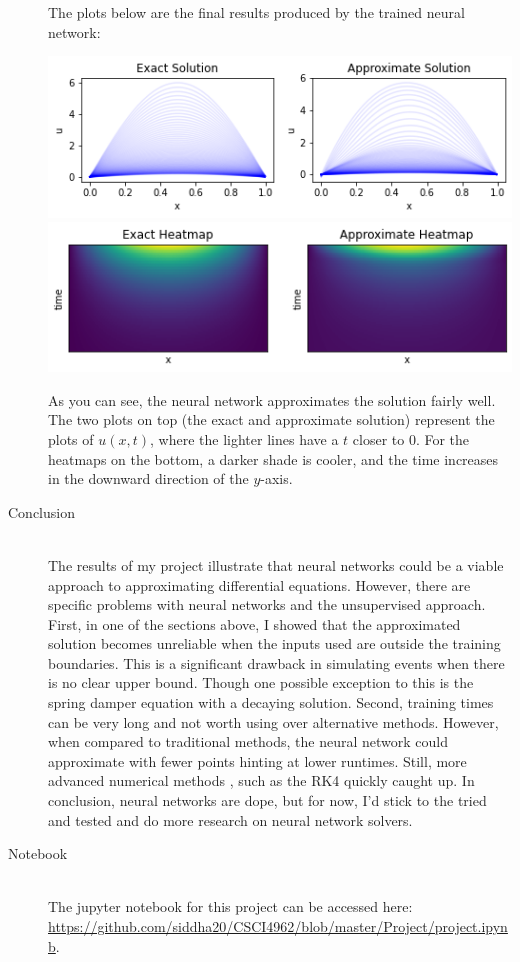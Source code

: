 \documentclass[12pt]{article}
\begin{document}
\begin{description}
    The plots below are the final results produced by the trained neural
    network: \\
    \begin{minipage}{\linewidth}
        \centering
        \includegraphics[scale=.5]{images/figure18.png}
        \includegraphics[scale=.5]{images/figure19.png}
    \end{minipage}
    As you can see, the neural network approximates the solution fairly well.
    The two plots on top (the exact and approximate solution) represent the
    plots of $u(x, t)$, where the lighter lines have a $t$ closer to 0. For the
    heatmaps on the bottom, a darker shade is cooler, and the time increases in
    the downward direction of the $y$-axis.

    \item[Conclusion] \hfill \\ 
    The results of my project illustrate that neural networks could be a viable
    approach to approximating differential equations. However, there are
    specific problems with neural networks and the unsupervised approach.
    First, in one of the sections above, I showed that the approximated
    solution becomes unreliable when the inputs used are outside the training
    boundaries. This is a significant drawback in simulating events when there
    is no clear upper bound. Though one possible exception to this is the
    spring damper equation with a decaying solution. Second, training times can
    be very long and not worth using over alternative methods. However, when
    compared to traditional methods, the neural network could approximate with
    fewer points hinting at lower runtimes. Still, more advanced numerical
    methods , such as the RK4 quickly caught up. In conclusion, neural networks
    are dope, but for now, I'd stick to the tried and tested and do more
    research on neural network solvers. 

    \item[Notebook] \hfill \\
    The jupyter notebook for this project can be accessed here: \\
    \url{https://github.com/siddha20/CSCI4962/blob/master/Project/project.ipynb}.
\end{description}
\end{document}

